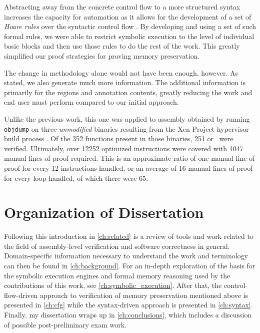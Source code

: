 Abstracting away from the concrete control flow to a more structured syntax
increases the capacity for automation
as it allows for the development of a set of \emph{Hoare rules}
over the syntactic control flow \autocite{hoare1969axiomatic}.
By developing and using a set of such formal rules, we were able to restrict symbolic execution
to the level of individual basic blocks and then use those rules to do the rest of the work.
This greatly simplified our proof strategies for proving memory preservation.

The change in methodology alone would not have been enough, however.
As stated, we also generate much more information.
The additional information is primarily for the regions and annotation contents,
greatly reducing the work and end user must perform compared to our initial approach.

Unlike the previous work, this one was applied to assembly obtained
by running \texttt{objdump} on three \emph{unmodified} binaries resulting from the
Xen Project hypervisor build process \autocite{chisnall2008definitive}.
Of the \num{352} functions present in those binaries,
\num{251} or \xenpercentage\ were verified.
Ultimately, over \num{12252} optimized instructions were covered
with \num{1047} manual lines of proof required.
This is an approximate ratio of one manual line of proof
for every \num{12} instructions handled,
or an average of \num{16} manual lines of proof for every loop handled,
of which there were \num{65}.

\section{Organization of Dissertation}
Following this introduction in \cref{ch:related} is a review of tools and work
related to the field of assembly-level verification and software correctness in general.
Domain-specific information necessary to understand the work
and terminology can then be found in \cref{ch:background}.
For an in-depth exploration of the basis for the symbolic execution engines
and formal memory reasoning used by the contributions of this work,
see \cref{ch:symbolic_execution}.
After that, the control-flow-driven approach to verification of memory preservation
mentioned above is presented in \cref{ch:cfg}
while the syntax-driven approach is presented in \cref{ch:syntax}.
Finally, my dissertation wraps up in \cref{ch:conclusions},
which includes a discussion of possible post-preliminary exam work.
